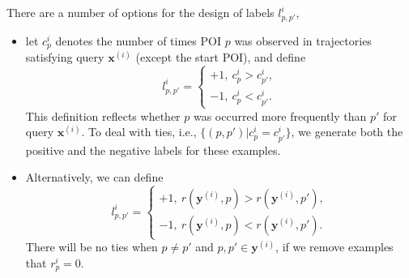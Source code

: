 There are a number of options for the design of labels $l_{p,p'}^i$,
\begin{itemize}
\item let $c_p^i$ denotes the number of times POI $p$ was observed in trajectories satisfying query $\mathbf{x}^{(i)}$ (except the start POI), and define
      \begin{equation*}
      l_{p,p'}^i = \begin{cases}
      +1,~ c_p^i > c_{p'}^i, \\
      -1,~ c_p^i < c_{p'}^i.
      \end{cases}
      \end{equation*}
      This definition reflects whether $p$ was occurred more frequently than $p'$ for query $\mathbf{x}^{(i)}$.
      To deal with ties, i.e., $\{(p, p') | c_p^i = c_{p'}^i\}$, we generate both the positive and the negative labels for these examples.
\item Alternatively, we can define
      \begin{equation*}
      l_{p,p'}^i = \begin{cases}
      +1,~ r(\mathbf{y}^{(i)}, p) > r(\mathbf{y}^{(i)}, p'), \\
      -1,~ r(\mathbf{y}^{(i)}, p) < r(\mathbf{y}^{(i)}, p').
      \end{cases}
      \end{equation*}
      There will be no ties when $p \ne p'$ and $p, p' \in \mathbf{y}^{(i)}$, if we remove examples that $r_p^i = 0$.
\end{itemize}


